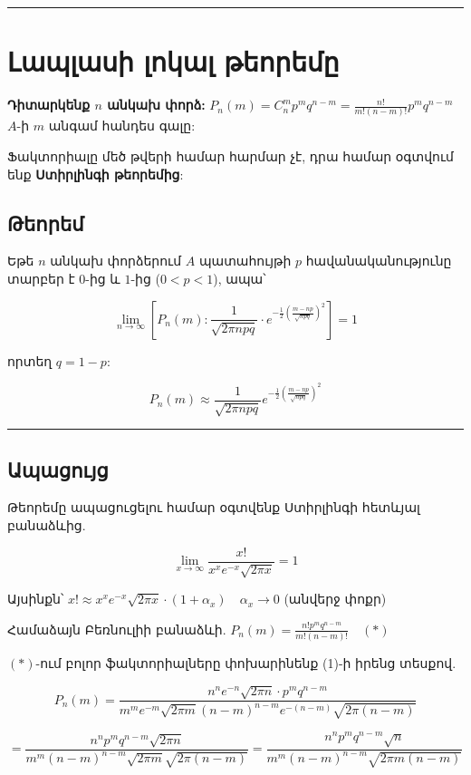 \documentclass[12pt, a4paper]{article}
\begin{document}
\tableofcontents
\vspace{2em}
\hrule
\vspace{2em}

\section{Լապլասի լոկալ թեորեմը}

\textbf{Դիտարկենք $n$ անկախ փորձ:}
$P_n(m) = C_n^m p^m q^{n-m} = \frac{n!}{m!(n-m)!} p^m q^{n-m}$
$A$-ի $m$ անգամ հանդես գալը:

Ֆակտորիալը մեծ թվերի համար հարմար չէ, դրա համար օգտվում ենք \textbf{Ստիրլինգի թեորեմից}:

\subsection{Թեորեմ}

Եթե $n$ անկախ փորձերում $A$ պատահույթի $p$ հավանականությունը տարբեր է $0$-ից և $1$-ից ($0 < p < 1$), ապա՝

$$\lim_{n \to \infty} \left[ P_n(m) : \frac{1}{\sqrt{2\pi npq}} \cdot e^{-\frac{1}{2} \left( \frac{m-np}{\sqrt{npq}} \right)^2} \right] = 1$$

որտեղ $q = 1 - p$:

$$P_n(m) \approx \frac{1}{\sqrt{2\pi npq}} e^{-\frac{1}{2} \left( \frac{m-np}{\sqrt{npq}} \right)^2}$$

\vspace{1em}
\hrule
\vspace{1em}

\subsection{Ապացույց}

Թեորեմը ապացուցելու համար օգտվենք Ստիրլինգի հետևյալ բանաձևից.

$$\lim_{x \to \infty} \frac{x!}{x^x e^{-x} \sqrt{2\pi x}} = 1$$

Այսինքն՝
$x! \approx x^x e^{-x} \sqrt{2\pi x} \cdot (1 + \alpha_x) \quad \alpha_x \to 0$ (անվերջ փոքր)

Համաձայն Բեռնուլիի բանաձևի.
$P_n(m) = \frac{n! p^m q^{n-m}}{m!(n-m)!} \quad (*)$

$(*)$-ում բոլոր ֆակտորիալները փոխարինենք (1)-ի իրենց տեսքով.

$$P_n(m) = \frac{n^n e^{-n} \sqrt{2\pi n} \cdot p^m q^{n-m}}{m^m e^{-m} \sqrt{2\pi m} (n-m)^{n-m} e^{-(n-m)} \sqrt{2\pi(n-m)}}$$

$$= \frac{n^n p^m q^{n-m} \sqrt{2\pi n}}{m^m (n-m)^{n-m} \sqrt{2\pi m} \sqrt{2\pi(n-m)}} = \frac{n^n p^m q^{n-m} \sqrt{n}}{m^m (n-m)^{n-m} \sqrt{2\pi m(n-m)}}$$
\end{document}
